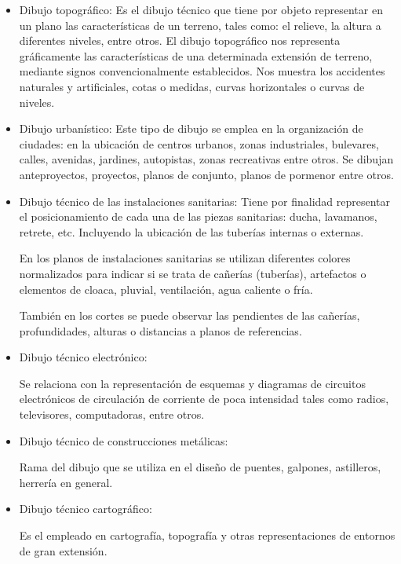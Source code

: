 \documentclass[../main]{subfiles}
\begin{document}
\begin{itemize}
\item Dibujo topográfico:
Es el dibujo técnico que tiene por objeto representar en un plano las características de un terreno, tales como: el relieve, la altura a diferentes niveles, entre otros. El dibujo topográfico nos representa gráficamente las características de una determinada extensión de terreno, mediante signos convencionalmente establecidos. Nos muestra los accidentes naturales y artificiales, cotas o medidas, curvas horizontales o curvas de niveles.

\item Dibujo urbanístico:
Este tipo de dibujo se emplea en la organización de ciudades: en la ubicación de centros urbanos, zonas industriales, bulevares, calles, avenidas, jardines, autopistas, zonas recreativas entre otros. Se dibujan anteproyectos, proyectos, planos de conjunto, planos de pormenor entre otros.

\item Dibujo técnico de las instalaciones sanitarias:
Tiene por finalidad representar el posicionamiento de cada una de las piezas sanitarias: ducha, lavamanos, retrete, etc. Incluyendo la ubicación de las tuberías internas o externas.

En los planos de instalaciones sanitarias se utilizan diferentes colores normalizados para indicar si se trata de cañerías (tuberías), artefactos o elementos de cloaca, pluvial, ventilación, agua caliente o fría.

También en los cortes se puede observar las pendientes de las cañerías, profundidades, alturas o distancias a planos de referencias.

\item Dibujo técnico electrónico:

Se relaciona con la representación de esquemas y diagramas de circuitos electrónicos de circulación de corriente de poca intensidad tales como radios, televisores, computadoras, entre otros.

\item Dibujo técnico de construcciones metálicas:

Rama del dibujo que se utiliza en el diseño de puentes, galpones, astilleros, herrería en general.

\item Dibujo técnico cartográfico:

Es el empleado en cartografía, topografía y otras representaciones de entornos de gran extensión.
\end{itemize}
\end{document}
